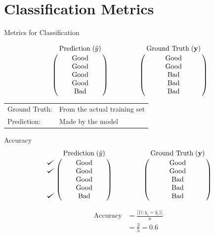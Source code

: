 \documentclass[usenames,dvipsnames]{beamer}
\begin{document}
\section{Classification Metrics}

\begin{frame}{Metrics for Classification}



$$\bordermatrix{&\text{Prediction}\;(\hat{y})\cr
                &\text{Good}\cr
                &\text{Good}\cr
                &\text{Good}\cr
                &\text{Good}\cr
                &\text{Bad}}
                \qquad \qquad
   \bordermatrix{&\text{Ground Truth}\;(\vy)\cr
                &\text{Good}\cr
                &\text{Good}\cr
                &\text{Bad}\cr
                &\text{Bad}\cr
                &\text{Bad}}
$$

\vspace{1cm}

\begin{tabular}{ll}
Ground Truth: & From the actual training set \\ 
Prediction: & Made by the model \\ 
\end{tabular}

\end{frame}

\begin{frame}{Accuracy}
$$
\bordermatrix{&\text{Prediction}\;(\hat{y})\cr
               \checkmark&\text{Good}\cr
               \checkmark&\text{Good}\cr
                &\text{Good}\cr
                &\text{Good}\cr
               \checkmark&\text{Bad}}
\qquad \qquad
\bordermatrix{&\text{Ground Truth}\;(\vy)\cr
                &\text{Good}\cr
                &\text{Good}\cr
                &\text{Bad}\cr
                &\text{Bad}\cr
                &\text{Bad}}
$$

\pause \begin{align*}
\text{Accuracy} &= \frac{|\{i : y_i = \hat{y}_i\}|}{n} \\ 
&= \frac{3}{5} = 0.6
\end{align*}

\end{frame}
\end{document}
